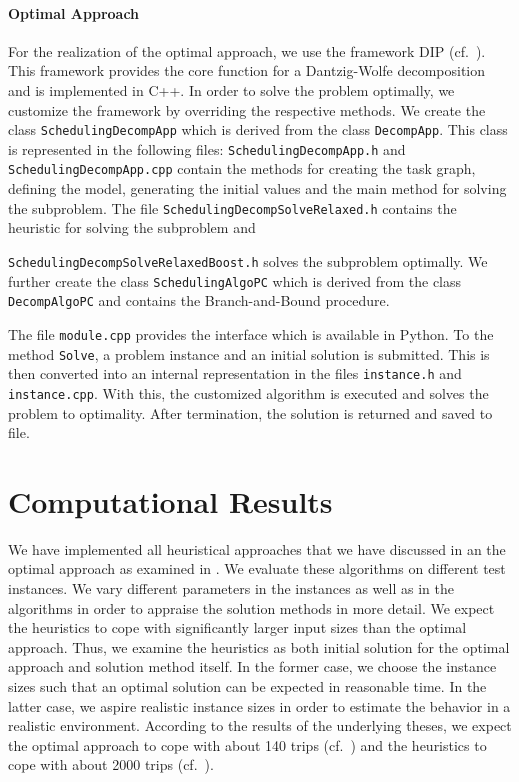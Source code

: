 \paragraph{Optimal Approach} \parfill

For the realization of the optimal approach, we use the framework DIP (cf.~\cite{DIP}). This framework provides the core function for a Dantzig-Wolfe decomposition and is implemented in C++. In order to solve the problem optimally, we customize the framework by overriding the respective methods. We create the class \texttt{SchedulingDecompApp} which is derived from the class \texttt{DecompApp}. This class is represented in the following files: \texttt{SchedulingDecompApp.h} and \texttt{SchedulingDecompApp.cpp} contain the methods for creating the task graph, defining the model, generating the initial values and the main method for solving the subproblem. The file \texttt{SchedulingDecompSolveRelaxed.h} contains the heuristic for solving the subproblem and\par \texttt{SchedulingDecompSolveRelaxedBoost.h} solves the subproblem optimally. We further create the class \texttt{SchedulingAlgoPC} which is derived from the class \texttt{DecompAlgoPC} and contains the Branch-and-Bound procedure.

The file \texttt{module.cpp} provides the interface which is available in Python. To the method \texttt{Solve}, a problem instance and an initial solution is submitted. This is then converted into an internal representation in the files \texttt{instance.h} and \texttt{instance.cpp}. With this, the customized algorithm is executed and solves the problem to optimality. After termination, the solution is returned and saved to file.


\section{Computational Results}
\label{sec:computational_results}

We have implemented all heuristical approaches that we have discussed in  an the optimal approach as examined in . We evaluate these algorithms on different test instances. We vary different parameters in the instances as well as in the algorithms in order to appraise the solution methods in more detail. We expect the heuristics to cope with significantly larger input sizes than the optimal approach. Thus, we examine the heuristics as both initial solution for the optimal approach and solution method itself. In the former case, we choose the instance sizes such that an optimal solution can be expected in reasonable time. In the latter case, we aspire realistic instance sizes in order to estimate the behavior in a realistic environment. According to the results of the underlying theses, we expect the optimal approach to cope with about 140 trips (cf.~\cite[p.~139]{Kaiser}) and the heuristics to cope with about 2000 trips (cf.~\cite[p.~138]{Knoll}).

